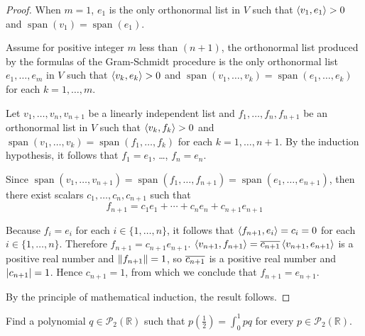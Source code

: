 \begin{proof}
    When $m = 1$, $e_{1}$ is the only orthonormal list in $V$ such that $\left\langle{v_{1}, e_{1}}\right\rangle > 0$ and $\operatorname{span}(v_{1}) = \operatorname{span}(e_{1})$.

    Assume for positive integer $m$ less than $(n+1)$, the orthonormal list produced by the formulas of the Gram-Schmidt procedure is the only orthonormal list $e_{1} , \ldots, e_{m}$ in $V$ such that $\left\langle{v_{k}, e_{k}}\right\rangle > 0$ and $\operatorname{span}(v_{1} , \ldots, v_{k}) = \operatorname{span}(e_{1} , \ldots, e_{k})$ for each $k = 1, \ldots, m$.

    Let $v_{1}, \ldots, v_{n}, v_{n+1}$ be a linearly independent list and $f_{1}, \ldots, f_{n}, f_{n+1}$ be an orthonormal list in $V$ such that $\left\langle{v_{k}, f_{k}}\right\rangle > 0$ and $\operatorname{span}(v_{1} , \ldots, v_{k}) = \operatorname{span}(f_{1} , \ldots, f_{k})$ for each $k = 1, \ldots, n+1$. By the induction hypothesis, it follows that $f_{1} = e_{1}$, \ldots, $f_{n} = e_{n}$.

    Since $\operatorname{span}(v_{1}, \ldots, v_{n+1}) = \operatorname{span}(f_{1}, \ldots, f_{n+1}) = \operatorname{span}(e_{1}, \ldots, e_{n+1})$, then there exist scalars $c_{1}, \ldots, c_{n}, c_{n+1}$ such that
    \[
        f_{n+1} = c_{1}e_{1} + \cdots + c_{n}e_{n} + c_{n+1}e_{n+1}
    \]

    Because $f_{i} = e_{i}$ for each $i\in\{ 1,\ldots, n \}$, it follows that $\left\langle{f_{n+1}, e_{i}}\right\rangle = c_{i} = 0$ for each $i\in\{ 1,\ldots, n \}$. Therefore $f_{n+1} = c_{n+1}e_{n+1}$. $\left\langle{v_{n+1}, f_{n+1}}\right\rangle = \overline{c_{n+1}}\left\langle{v_{n+1}, e_{n+1}}\right\rangle$ is a positive real number and $\left\Vert{f_{n+1}}\right\Vert = 1$, so $\overline{c_{n+1}}$ is a positive real number and $\left\vert{c_{n+1}}\right\vert = 1$. Hence $c_{n+1} = 1$, from which we conclude that $f_{n+1} = e_{n+1}$.

    By the principle of mathematical induction, the result follows.
\end{proof}
\newpage

\begin{exercise}
    Find a polynomial $q\in\mathscr{P}_{2}(\mathbb{R})$ such that $p\left(\frac{1}{2}\right) = \int^{1}_{0}pq$ for every $p\in\mathscr{P}_{2}(\mathbb{R})$.
\end{exercise}

